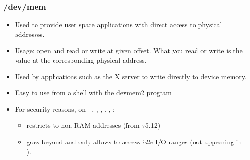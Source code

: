 \begin{frame}
  \frametitle{/dev/mem}
  \begin{itemize}
  \item Used to provide user space applications with direct access to
    physical addresses.
  \item Usage: open  and read or write at given offset.
    What you read or write is the value at the corresponding physical
    address.
  \item Used by applications such as the X server to write directly to
    device memory.
  \item Easy to use from a shell with the devmem2 program
  \item For security reasons, on , , ,
    , , , :
    \begin{itemize}
    \item {} restricts 
      to non-RAM addresses (from v5.12)
    \item {} goes beyond and only allows to
      access {\em idle} I/O ranges (not appearing in ).
    \end{itemize}
  \end{itemize}
\end{frame}
